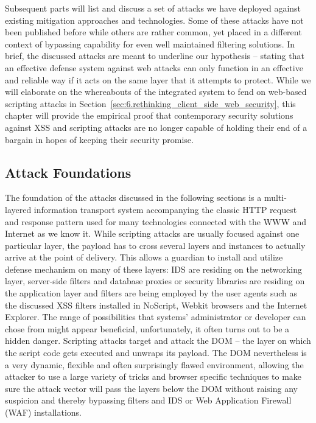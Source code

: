     Subsequent parts will list and discuss a set of attacks we have deployed against existing mitigation approaches and technologies. Some of these attacks have not been published before while others are rather common, yet placed in a different context of bypassing capability for even well maintained filtering solutions. In brief, the discussed attacks are meant to underline our hypothesis -- stating that an effective defense system against web attacks can only function in an effective and reliable way if it acts on the same layer that it attempts to protect. While we will elaborate on the whereabouts of the integrated system to fend on web-based scripting attacks in Section~\ref{sec:6.rethinking_client_side_web_security}, this chapter will provide the empirical proof that contemporary security solutions against XSS and scripting attacks are no longer capable of holding their end of a bargain in hopes of keeping their security promise.

    \subsection{Attack Foundations}
    \label{subsubsec:5.4.1.attack_foundations}

    The foundation of the attacks discussed in the following sections is a multi-layered information transport system accompanying the classic HTTP request and response pattern used for many technologies connected with the WWW and Internet as we know it. While scripting attacks are usually focused against one particular layer, the payload has to cross several layers and instances to actually arrive at the point of delivery. This allows a guardian to install and utilize defense mechanism on many of these layers: IDS are residing on the networking layer, server-side filters and database proxies or security libraries are residing on the application layer and filters are being employed by the user agents such as the discussed XSS filters installed in NoScript, Webkit browsers and the Internet Explorer. The range of possibilities that systems' administrator or developer can chose from might appear beneficial, unfortunately, it often turns out to be a hidden danger. Scripting attacks target and attack the DOM -- 
the layer on which the script code gets executed and unwraps its payload. The DOM nevertheless is a very dynamic, flexible and often surprisingly flawed environment, allowing the attacker to use a large variety of tricks and browser specific techniques to make sure the attack vector will pass the layers below the DOM without raising any suspicion and thereby bypassing filters and IDS or Web Application Firewall (WAF) installations.\\


